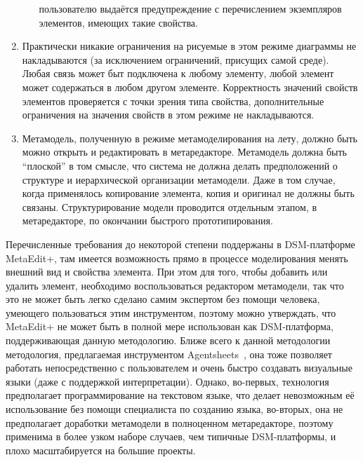 \begin{enumerate}
\begin{enumerate}
			пользователю выдаётся предупреждение с перечислением экземпляров элементов, имеющих 
			такие свойства.
		\end{enumerate}
	\item Практически никакие ограничения на рисуемые в этом режиме диаграммы не накладываются 
		(за исключением ограничений, присущих самой среде). Любая связь может быт подключена 
		к любому элементу, любой элемент может содержаться в любом другом элементе. Корректность 
		значений свойств элементов проверяется с точки зрения типа свойства, дополнительные 
		ограничения на значения свойств в этом режиме не накладываются.
	\item Метамодель, полученную в режиме метамоделирования на лету, должно быть можно 
		открыть и редактировать в метаредакторе. Метамодель должна быть "`плоской"' в том 
		смысле, что система не должна делать предположений о структуре и иерархической 
		организации метамодели. Даже в том случае, когда применялось копирование элемента, 
		копия и оригинал не должны быть связаны. Структурирование модели проводится отдельным 
		этапом, в метаредакторе, по окончании быстрого прототипирования.
\end{enumerate}

Перечисленные требования до некоторой степени поддержаны в DSM-платформе MetaEdit+,
там имеется возможность прямо в процессе моделирования менять внешний вид и свойства элемента. 
При этом для того, чтобы добавить или удалить элемент, необходимо воспользоваться редактором метамодели, 
так что это не может быть легко сделано самим экспертом без помощи человека, умеющего пользоваться этим 
инструментом, поэтому можно утверждать, что MetaEdit+ не может быть в полной мере использован как 
DSM-платформа, поддерживающая данную методологию. Ближе всего к данной методологии 
методология, предлагаемая инструментом Agentsheets~\cite{repenning1995agentsheets}, 
она тоже позволяет работать непосредственно с пользователем и очень быстро создавать 
визуальные языки (даже с поддержкой интерпретации). Однако, во-первых, технология 
предполагает программирование на текстовом языке, что делает невозможным её использование 
без помощи специалиста по созданию языка, во-вторых, она не предполагает доработки метамодели 
в полноценном метаредакторе, поэтому применима в более узком наборе случаев, чем типичные 
DSM-платформы, и плохо масштабируется на большие проекты.

